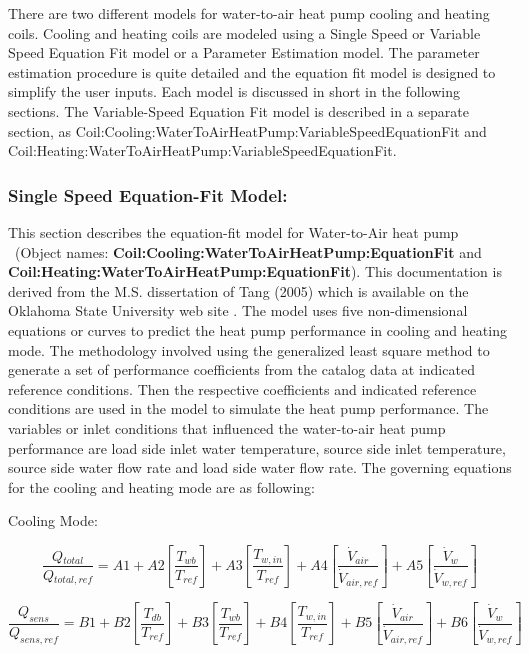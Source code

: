 There are two different models for water-to-air heat pump cooling and heating coils. Cooling and heating coils are modeled using a Single Speed or Variable Speed Equation Fit model or a Parameter Estimation model. The parameter estimation procedure is quite detailed and the equation fit model is designed to simplify the user inputs. Each model is discussed in short in the following sections. The Variable-Speed Equation Fit model is described in a separate section, as Coil:Cooling:WaterToAirHeatPump:VariableSpeedEquationFit and Coil:Heating:WaterToAirHeatPump:VariableSpeedEquationFit.

\subsubsection{Single Speed Equation-Fit Model:}\label{single-speed-equation-fit-model}

This section describes the equation-fit model for Water-to-Air heat pump ~(Object names: \textbf{Coil:Cooling:WaterToAirHeatPump:EquationFit} and \textbf{Coil:Heating:WaterToAirHeatPump:EquationFit}). This documentation is derived from the M.S. dissertation of Tang (2005) which is available on the Oklahoma State University web site . The model uses five non-dimensional equations or curves to predict the heat pump performance in cooling and heating mode. The methodology involved using the generalized least square method to generate a set of performance coefficients from the catalog data at indicated reference conditions. Then the respective coefficients and indicated reference conditions are used in the model to simulate the heat pump performance. The variables or inlet conditions that influenced the water-to-air heat pump performance are load side inlet water temperature, source side inlet temperature, source side water flow rate and load side water flow rate. The governing equations for the cooling and heating mode are as following:

Cooling Mode:

\begin{equation}
\frac{{Q{}_{total}}}{{Q{}_{total,ref}}} = A1 + A2\left[ {\frac{{{T_{wb}}}}{{{T_{ref}}}}} \right] + A3\left[ {\frac{{T{}_{w,in}}}{{T{}_{ref}}}} \right] + A4\left[ {\frac{{{{\dot V}_{air}}}}{{{{\dot V}_{air,ref}}}}} \right] + A5\left[ {\frac{{{{\dot V}_w}}}{{{{\dot V}_{w,ref}}}}} \right]
\end{equation}

\begin{equation}
\frac{{{Q_{sens}}}}{{{Q_{sens,ref}}}} = B1 + B2\left[ {\frac{{T{}_{db}}}{{T{}_{ref}}}} \right] + B3\left[ {\frac{{T{}_{wb}}}{{T{}_{ref}}}} \right] + B4\left[ {\frac{{T{}_{w,in}}}{{T{}_{ref}}}} \right] + B5\left[ {\frac{{{{\dot V}_{air}}}}{{{{\dot V}_{air,ref}}}}} \right] + B6\left[ {\frac{{\dot V{}_w}}{{\dot V{}_{w,ref}}}} \right]
\end{equation}

